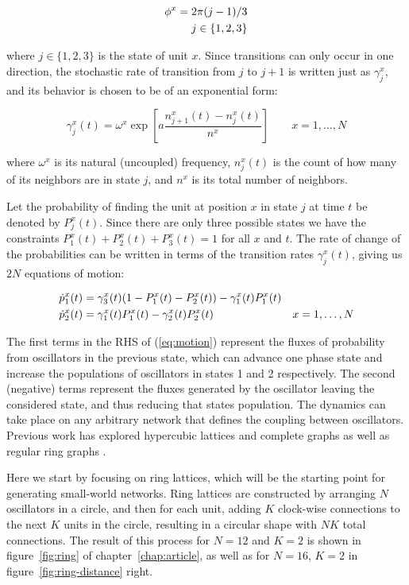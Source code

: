 \begin{align}
  \phi^x = 2\pi (j-1)/3 \\
  j \in \{1,2,3\} \notag
\end{align}

\noindent where $j\in\{1,2,3\}$ is the state of unit $x$. Since transitions can only occur in one direction, the stochastic rate of
transition from $j$ to $j+1$ is written just as $\gamma^x_j$, and its behavior is chosen to be of an exponential form:

\begin{equation}
  \gamma^x_j(t) = \omega^x\exp\left[ a\frac{n^x_{j+1}(t) - n^x_j(t)}{n^x} \right] \qquad x=1,\dots, N
  \label{rate}
\end{equation}

\noindent where $\omega^x$ is its natural (uncoupled) frequency, $n^x_j(t)$ is the count of how many of its neighbors are in state $j$,
and $n^x$ is its total number of neighbors.

Let the probability of finding the unit at position $x$ in state $j$ at time $t$ be denoted by $P_j^x(t)$. Since there are only three
possible states we have the constraints $P_1^x(t)+P_2^x(t)+P_3^x(t)=1$ for all $x$ and $t$. The rate of change of the probabilities can
be written in terms of the transition rates $\gamma^x_j(t)$, giving us $2N$ equations of motion:

\begin{align}
  \dot{p}^x_1(t) &= \gamma^x_3(t)(1 - P_1^x(t) - P_2^x(t)) - \gamma^x_1(t) P_1^x(t) & \notag\\
  \dot{p}^x_2(t) &= \gamma^x_1(t)P_1^x(t) - \gamma^x_2(t) P_2^x(t) &x=1,\dots,N
  \label{eq:motion}
\end{align}

\noindent The first terms in the RHS of (\ref{eq:motion}) represent the fluxes of probability from oscillators in the previous state,
which can advance one phase state and increase the populations of oscillators in states 1 and 2 respectively. The second (negative)
terms represent the fluxes generated by the oscillator leaving the considered state, and thus reducing that states population. The
dynamics can take place on any arbitrary network that defines the coupling between oscillators. Previous work has explored hypercubic
lattices and complete graphs as well as regular ring graphs \cite{Wood06a,assis2011infinite,escaff2014arrays}.

Here we start by focusing on ring lattices, which will be the starting point for generating small-world networks. Ring lattices are
constructed by arranging $N$ oscillators in a circle, and then for each unit, adding $K$ clock-wise connections to the next $K$ units
in the circle, resulting in a circular shape with $NK$ total connections. The result of this process for $N=12$ and $K=2$ is shown in
figure~\ref{fig:ring} of chapter~\ref{chap:article}, as well as for $N=16$, $K=2$ in figure~\ref{fig:ring-distance} right.

